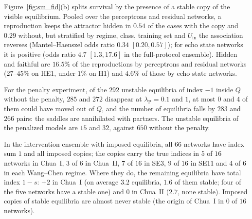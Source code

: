 \documentclass[aip,cha,preprint,amsmath,amssymb,longbibliography]{revtex4-2}
\newcommand{\Uin}{U_{\mathrm{in}}}
\begin{document}
Figure~\ref{fig:sm_fid}(b) splits survival by the presence of a stable copy of the visible equilibrium. Pooled over the
perceptrons and residual networks, a reproduction keeps the attractor hidden in $0.54$ of the cases with the copy and $0.29$
without, but stratified by regime, class, training set and $\Uin$ the association reverses (Mantel--Haenszel odds ratio
$0.34$ $[0.20,0.57]$); for echo state networks it is positive (odds ratio $4.7$ $[1.3,17.6]$ in the full-protocol ensemble).
Hidden and faithful are $16.5\%$ of the reproductions by perceptrons and residual networks ($27$--$45\%$ on HE1, under $1\%$ on
H1) and $4.6\%$ of those by echo state networks.

For the penalty experiment, of the $292$ unstable equilibria of index $-1$ inside $Q$ without the penalty, $285$ and $272$
disappear at $\lambda_{\mathrm{P}}=0.1$ and $1$, at most $0$ and $4$ of them could have moved out of $Q$, and the number of
equilibria falls by $283$ and $266$ pairs: the saddles are annihilated with partners. The unstable equilibria of the
penalized models are $15$ and $32$, against $650$ without the penalty.

In the intervention ensemble with imposed equilibria, all $66$ networks have index sum $1$ and all imposed copies; the copies
carry the true indices in $5$ of $16$ networks in Chua~I, $3$ of $6$ in Chua~II, $7$ of $16$ in SE3, $9$ of $16$ in SE11 and
$4$ of $6$ in each Wang--Chen regime. Where they do, the remaining equilibria have total index $1-s$: $+2$ in Chua~I (on
average $3.2$ equilibria, $1.6$ of them stable; four of the five networks have a stable one) and $0$ in Chua~II ($2.7$, none
stable). Imposed copies of stable equilibria are almost never stable (the origin of Chua~I in $0$ of $16$ networks).
\end{document}

